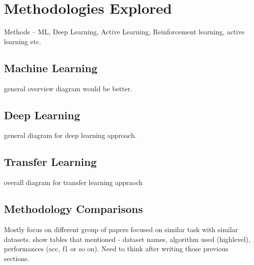 \section{Methodologies Explored}
Methods -- ML, Deep Learning, Active Learning, Reinforcement learning, active learning etc.

\subsection{Machine Learning}
general overview diagram would be better.
\subsection{Deep Learning}
general diagram for deep learning approach.
\subsection{Transfer Learning}
overall diagram for transfer learning appraoch
\subsection{Methodology Comparisons}
Mostly focus on different group of papers focused on similar task with similar datasets. 
show tables that mentioned - dataset names, algorithm used (highlevel), performances (acc, f1 or so on). Need to think after writing those previous sections.
